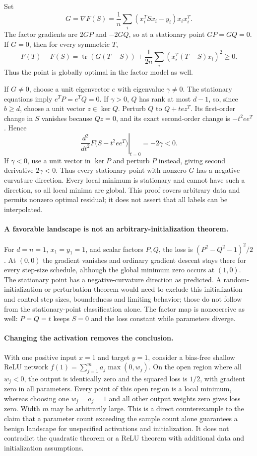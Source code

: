 \documentclass[11pt]{article}
\begin{document}
Set
\[
 G=\nabla F(S)=\frac1n\sum_i(x_i^TSx_i-y_i)x_ix_i^T.
\]
The factor gradients are $2GP$ and $-2GQ$, so at a stationary point $GP=GQ=0$. If $G=0$, then for every symmetric $T$,
\[
 F(T)-F(S)=\operatorname{tr}(G(T-S))+
            \frac1{2n}\sum_i(x_i^T(T-S)x_i)^2\ge0.
\]
Thus the point is globally optimal in the factor model as well.

If $G\ne0$, choose a unit eigenvector $e$ with eigenvalue $\gamma\ne0$. The stationary equations imply $e^TP=e^TQ=0$. If $\gamma>0$, $Q$ has rank at most $d-1$, so, since $b\ge d$, choose a unit vector $z\in\ker Q$. Perturb $Q$ to $Q+t ez^T$. Its first-order change in $S$ vanishes because $Qz=0$, and its exact second-order change is $-t^2ee^T$. Hence
\[
 \left.\frac{d^2}{dt^2}F\bigl(S-t^2ee^T\bigr)\right|_{t=0}=-2\gamma<0.
\]
If $\gamma<0$, use a unit vector in $\ker P$ and perturb $P$ instead, giving second derivative $2\gamma<0$. Thus every stationary point with nonzero $G$ has a negative-curvature direction. Every local minimum is stationary and cannot have such a direction, so all local minima are global. This proof covers arbitrary data and permits nonzero optimal residual; it does not assert that all labels can be interpolated.

\paragraph{A favorable landscape is not an arbitrary-initialization theorem.}
For $d=n=1$, $x_1=y_1=1$, and scalar factors $P,Q$, the loss is $(P^2-Q^2-1)^2/2$. At $(0,0)$ the gradient vanishes and ordinary gradient descent stays there for every step-size schedule, although the global minimum zero occurs at $(1,0)$. The stationary point has a negative-curvature direction as predicted. A random-initialization or perturbation theorem would need to exclude this initialization and control step sizes, boundedness and limiting behavior; those do not follow from the stationary-point classification alone. The factor map is noncoercive as well: $P=Q=t$ keeps $S=0$ and the loss constant while parameters diverge.

\paragraph{Changing the activation removes the conclusion.}
With one positive input $x=1$ and target $y=1$, consider a bias-free shallow ReLU network $f(1)=\sum_{j=1}^m a_j\max(0,w_j)$. On the open region where all $w_j<0$, the output is identically zero and the squared loss is $1/2$, with gradient zero in all parameters. Every point of this open region is a local minimum, whereas choosing one $w_j=a_j=1$ and all other output weights zero gives loss zero. Width $m$ may be arbitrarily large. This is a direct counterexample to the claim that a parameter count exceeding the sample count alone guarantees a benign landscape for unspecified activations and initialization. It does not contradict the quadratic theorem or a ReLU theorem with additional data and initialization assumptions.
\end{document}
